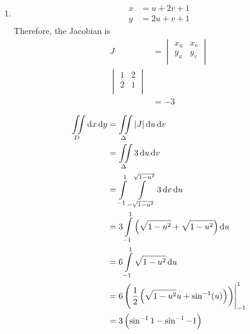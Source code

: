 \documentclass[fleqn, a4paper, 11pt, oneside]{amsart}
\theoremstyle{definition}
\theoremstyle{theorem}
\begin{document}
\begin{solution}
	\begin{enumerate}[leftmargin = *]
		\item
			\begin{align*}
				x & = u + 2 v + 1 \\
				y & = 2 u + v + 1
			\end{align*}
			Therefore, the Jacobian is
			\begin{align*}
				J &=
					\begin{vmatrix}
						x_u & x_v \\
						y_u & y_v \\
					\end{vmatrix}\\
					\begin{vmatrix}
						1 & 2\\
						2 & 1\\
					\end{vmatrix}\\
				&= -3\\
			\end{align*}
			\begin{align*}
				\iint\limits_{D} \dif x \dif y & = \iint\limits_{\Delta} |J| \dif u \dif v                                                             \\
                                                               & = \iint\limits_{\Delta} 3 \dif u \dif v                                                               \\
                                                               & = \int\limits_{-1}^{1} \int\limits_{-\sqrt{1 - u^2}}^{\sqrt{1 - u^2}} 3 \dif v \dif u                 \\
                                                               & = 3 \int\limits_{-1}^{1} \left( \sqrt{1 - u^2} + \sqrt{1 - u^2} \right) \dif u                        \\
                                                               & = 6 \int\limits_{-1}^{1} \sqrt{1 - u^2} \dif u                                                        \\
                                                               & = 6 \left( \left. \frac{1}{2} \left( \sqrt{1 - u^2} u + \sin^{-1}(u) \right) \right) \right|_{-1}^{1} \\
                                                               & = 3 \left( \sin^{-1} 1 - \sin^{-1} -1 \right)                                                         \\

\end{align*}
\end{enumerate}
\end{solution}
\end{document}
